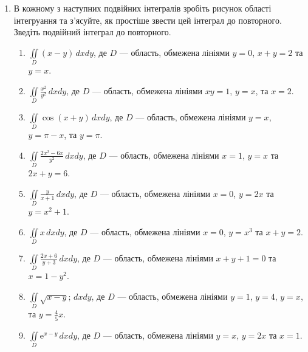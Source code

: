 \begin{enumerate}
\item\label{problem:measurable_sets:self_control:double:reduction} В кожному з наступних подвійних інтегралів зробіть рисунок області інтегруання та з'ясуйте, як простіше звести цей інтеграл до повторного. Зведіть подвійний інтеграл до повторного.
\begin{enumerate}[label*=\arabic*.]
    \item $\iint\limits_D (x - y) \, d x d y$, де $D$ --- область, обмежена лініями $y = 0$, $x + y = 2$ та $y = x$.

    \item $\iint\limits_D \frac{x^{2}}{y^{2}} \, d x d y$, де $D$ --- область, обмежена лініями $x y = 1$, $y = x$, та $x = 2$.

    \item $\iint\limits_D \cos\left(x+y\right) \, d x d y$, де $D$ --- область, обмежена лініями $y = x$, $y = \pi - x$, та $y = \pi$.

    \item $\iint\limits_D \frac{2x^{2}-6 x}{y^{2}} \, d x d y$, де $D$ --- область, обмежена лініями $x = 1$, ${y = x}$ та ${2 x + y = 6}$.

    \item $\iint\limits_D \frac{y}{x+1} \, d x d y$, де $D$ --- область, обмежена лініями $x = 0$, ${y = 2 x}$ та ${y = x^2 + 1}$.

    \item $\iint\limits_D x \, d x d y$, де $D$ --- область, обмежена лініями $x = 0$, ${y = x^3}$ та ${x + y = 2}$.

    \item $\iint\limits_D \frac{2 x+6}{y+3} \, d x d y$, де $D$ --- область, обмежена лініями ${x + y + 1 = 0}$ та ${x = 1 - y^2}$.

    \item $\iint\limits_D  \sqrt{x -y}; \, d x d y$, де $D$ --- область, обмежена лініями $y = 1$, $y = 4$, $y = x$, та $y = \frac{4}{5}x$.

    \item $\iint\limits_D {\mathrm e}^{x-y} \, d x d y$, де $D$ --- область, обмежена лініями ${y = x}$, ${ y = 2 x}$ та $x = 1$.


\end{enumerate}
\end{enumerate}
